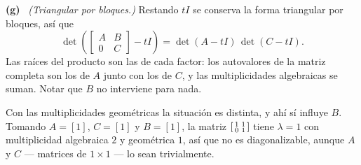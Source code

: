 \documentclass[11pt,a4paper]{article}
\newcommand{\itemsol}[1]{\par\medskip\noindent\textbf{(#1)}\ \ignorespaces}
\begin{document}
\itemsol{g} \emph{(Triangular por bloques.)} Restando $tI$ se conserva la forma
triangular por bloques, así que
\[
\det\left(\begin{bmatrix}A&B\\ 0&C\end{bmatrix}-tI\right)=\det(A-tI)\,\det(C-tI).
\]
Las raíces del producto son las de cada factor: los autovalores de la matriz
completa son los de $A$ junto con los de $C$, y las multiplicidades algebraicas
se suman. Notar que $B$ no interviene para nada.

Con las multiplicidades geométricas la situación es distinta, y ahí sí influye
$B$. Tomando $A=[1]$, $C=[1]$ y $B=[1]$, la matriz
$\begin{bsmallmatrix}1&1\\0&1\end{bsmallmatrix}$ tiene $\lambda=1$ con
multiplicidad algebraica $2$ y geométrica $1$, así que no es diagonalizable,
aunque $A$ y $C$ --- matrices de $1\times1$ --- lo sean trivialmente.
\end{document}

